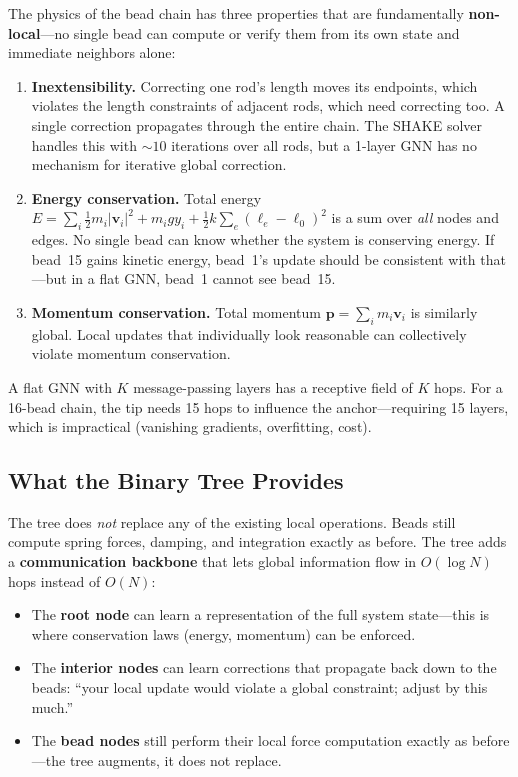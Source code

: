 \documentclass[11pt,a4paper]{article}
\begin{document}
The physics of the bead chain has three properties that are fundamentally
\textbf{non-local}---no single bead can compute or verify them from its own
state and immediate neighbors alone:

\begin{enumerate}
    \item \textbf{Inextensibility.} Correcting one rod's length moves its
          endpoints, which violates the length constraints of adjacent rods,
          which need correcting too. A single correction propagates through
          the entire chain. The SHAKE solver handles this with ${\sim}10$
          iterations over all rods, but a 1-layer GNN has no mechanism for
          iterative global correction.

    \item \textbf{Energy conservation.} Total energy $E = \sum_i
          \tfrac{1}{2}m_i|\mathbf{v}_i|^2 + m_i g y_i + \tfrac{1}{2}k
          \sum_e(\ell_e - \ell_0)^2$ is a sum over \emph{all} nodes and
          edges. No single bead can know whether the system is conserving
          energy. If bead~15 gains kinetic energy, bead~1's update should be
          consistent with that---but in a flat GNN, bead~1 cannot see bead~15.

    \item \textbf{Momentum conservation.} Total momentum
          $\mathbf{p} = \sum_i m_i \mathbf{v}_i$ is similarly global. Local
          updates that individually look reasonable can collectively violate
          momentum conservation.
\end{enumerate}

A flat GNN with $K$ message-passing layers has a receptive field of $K$ hops.
For a 16-bead chain, the tip needs 15 hops to influence the anchor---requiring
15 layers, which is impractical (vanishing gradients, overfitting, cost).

\subsection{What the Binary Tree Provides}

The tree does \emph{not} replace any of the existing local operations. Beads
still compute spring forces, damping, and integration exactly as before. The
tree adds a \textbf{communication backbone} that lets global information flow
in $O(\log N)$ hops instead of $O(N)$:

\begin{itemize}
    \item The \textbf{root node} can learn a representation of the full system
          state---this is where conservation laws (energy, momentum) can be
          enforced.
    \item The \textbf{interior nodes} can learn corrections that propagate
          back down to the beads: ``your local update would violate a global
          constraint; adjust by this much.''
    \item The \textbf{bead nodes} still perform their local force computation
          exactly as before---the tree augments, it does not replace.
\end{itemize}
\end{document}
